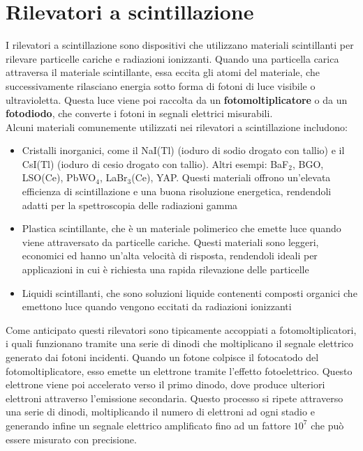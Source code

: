 \section{Rilevatori a scintillazione}
I rilevatori a scintillazione sono dispositivi che utilizzano materiali scintillanti per rilevare particelle cariche e radiazioni ionizzanti. Quando una particella carica attraversa il materiale scintillante, essa eccita gli atomi del materiale, che successivamente rilasciano energia sotto forma di fotoni di luce visibile o ultravioletta. Questa luce viene poi raccolta da un \textbf{fotomoltiplicatore} o da un \textbf{fotodiodo}, che converte i fotoni in segnali elettrici misurabili.\\
Alcuni materiali comunemente utilizzati nei rilevatori a scintillazione includono:
\begin{itemize}
    \item Cristalli inorganici, come il NaI(Tl) (ioduro di sodio drogato con tallio) e il CsI(Tl) (ioduro di cesio drogato con tallio). Altri esempi: BaF$_2$, BGO, LSO(Ce), PbWO$_4$, LaBr$_3$(Ce), YAP. Questi materiali offrono un'elevata efficienza di scintillazione e una buona risoluzione energetica, rendendoli adatti per la spettroscopia delle radiazioni gamma
    \item Plastica scintillante, che è un materiale polimerico che emette luce quando viene attraversato da particelle cariche. Questi materiali sono leggeri, economici ed hanno un'alta velocità di risposta, rendendoli ideali per applicazioni in cui è richiesta una rapida rilevazione delle particelle
    \item Liquidi scintillanti, che sono soluzioni liquide contenenti composti organici che emettono luce quando vengono eccitati da radiazioni ionizzanti
\end{itemize}
Come anticipato questi rilevatori sono tipicamente accoppiati a fotomoltiplicatori, i quali funzionano tramite una serie di dinodi che moltiplicano il segnale elettrico generato dai fotoni incidenti. Quando un fotone colpisce il fotocatodo del fotomoltiplicatore, esso emette un elettrone tramite l'effetto fotoelettrico. Questo elettrone viene poi accelerato verso il primo dinodo, dove produce ulteriori elettroni attraverso l'emissione secondaria. Questo processo si ripete attraverso una serie di dinodi, moltiplicando il numero di elettroni ad ogni stadio e generando infine un segnale elettrico amplificato fino ad un fattore $10^7$ che può essere misurato con precisione.


